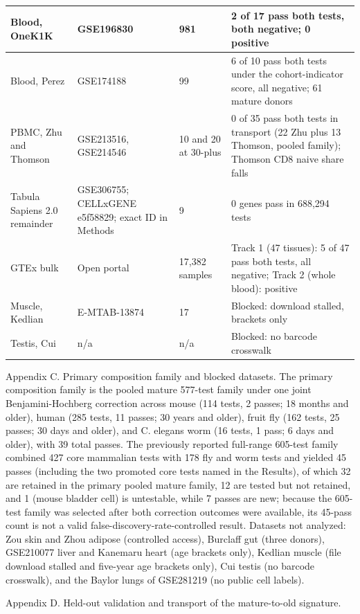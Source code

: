 \documentclass[11pt]{article}
\begin{document}
{\begin{longtable}{p{}p{}p{}p{}}
Blood, OneK1K & GSE196830 & 981 & 2 of 17 pass both tests, both negative; 0 positive \\ \hline
Blood, Perez & GSE174188 & 99 & 6 of 10 pass both tests under the cohort-indicator score, all negative; 61 mature donors \\
PBMC, Zhu and Thomson & GSE213516, GSE214546 & 10 and 20 at 30-plus & 0 of 35 pass both tests in transport (22 Zhu plus 13 Thomson, pooled family); Thomson CD8 naive share falls \\ \hline
Tabula Sapiens 2.0 remainder & GSE306755; CELLxGENE e5f58829; exact ID in Methods & 9 & 0 genes pass in 688,294 tests \\ \hline
GTEx bulk & Open portal & 17,382 samples & Track 1 (47 tissues): 5 of 47 pass both tests, all negative; Track 2 (whole blood): positive \\ \hline
Muscle, Kedlian & E-MTAB-13874 & 17 & Blocked: download stalled, brackets only \\ \hline
Testis, Cui & n/a & n/a & Blocked: no barcode crosswalk \\ \hline
\end{longtable}}

Appendix C. Primary composition family and blocked datasets. The primary composition family is the pooled mature 577-test family under one joint Benjamini-Hochberg correction across mouse (114 tests, 2 passes; 18 months and older), human (285 tests, 11 passes; 30 years and older), fruit fly (162 tests, 25 passes; 30 days and older), and C. elegans worm (16 tests, 1 pass; 6 days and older), with 39 total passes. The previously reported full-range 605-test family combined 427 core mammalian tests with 178 fly and worm tests and yielded 45 passes (including the two promoted core tests named in the Results), of which 32 are retained in the primary pooled mature family, 12 are tested but not retained, and 1 (mouse bladder cell) is untestable, while 7 passes are new; because the 605-test family was selected after both correction outcomes were available, its 45-pass count is not a valid false-discovery-rate-controlled result. Datasets not analyzed: Zou skin and Zhou adipose (controlled access), Burclaff gut (three donors), GSE210077 liver and Kanemaru heart (age brackets only), Kedlian muscle (file download stalled and five-year age brackets only), Cui testis (no barcode crosswalk), and the Baylor lungs of GSE281219 (no public cell labels).

Appendix D. Held-out validation and transport of the mature-to-old signature.
\end{document}
